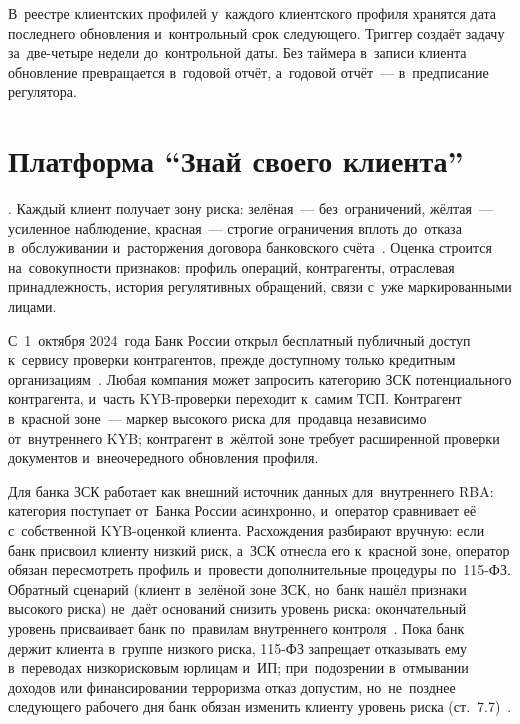 В~реестре клиентских профилей у~каждого клиентского профиля хранятся дата последнего обновления и~контрольный срок следующего. Триггер создаёт задачу за~две-четыре недели
до~контрольной даты. Без таймера в~записи клиента обновление превращается
в~годовой отчёт, а~годовой отчёт~--- в~предписание регулятора.

\section{Платформа \enquote{Знай своего клиента}}\label{sec:kyc-zsk}

. Каждый
клиент получает зону риска: зелёная~--- без~ограничений, жёлтая~---
усиленное наблюдение, красная~--- строгие ограничения вплоть до~отказа
в~обслуживании и~расторжения договора банковского
счёта~\cite{cbr-platform-zsk}. Оценка строится на~совокупности признаков:
профиль операций, контрагенты, отраслевая принадлежность, история регулятивных
обращений, связи с~уже маркированными лицами.

С~1~октября 2024~года Банк России открыл бесплатный публичный доступ к~сервису
проверки контрагентов, прежде доступному только кредитным
организациям~\cite{cbr-zsk-public-2024}. Любая компания может запросить категорию
ЗСК потенциального контрагента, и~часть KYB-проверки переходит к~самим ТСП.
Контрагент в~красной зоне~--- маркер высокого риска для~продавца независимо
от~внутреннего KYB; контрагент в~жёлтой зоне требует расширенной проверки
документов и~внеочередного обновления профиля.

Для банка ЗСК работает как внешний источник данных для~внутреннего RBA: категория
поступает от~Банка России асинхронно, и~оператор сравнивает её с~собственной
KYB-оценкой клиента. Расхождения разбирают вручную:
если банк присвоил клиенту низкий риск, а~ЗСК отнесла его к~красной зоне,
оператор обязан пересмотреть профиль и~провести дополнительные процедуры
по~115-ФЗ.
Обратный сценарий (клиент в~зелёной зоне ЗСК, но~банк нашёл признаки высокого
риска) не~даёт оснований снизить уровень риска: окончательный уровень присваивает
банк по~правилам внутреннего контроля~\cite{cbr-platform-zsk}. Пока банк держит
клиента в~группе низкого риска, 115-ФЗ запрещает отказывать ему в~переводах
низкорисковым юрлицам и~ИП; при~подозрении в~отмывании доходов или
финансировании терроризма отказ допустим, но~не~позднее следующего рабочего
дня банк обязан изменить клиенту уровень риска (ст.~7.7)~\cite{fz-115}.

